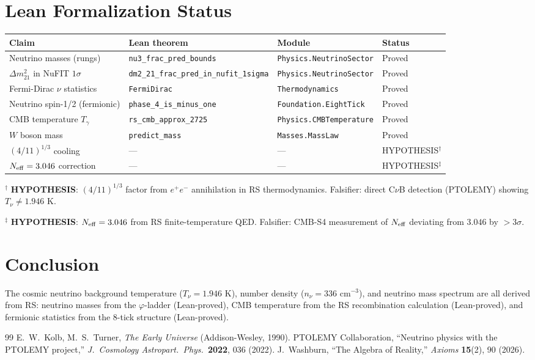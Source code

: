 \documentclass[12pt,a4paper]{article}
\theoremstyle{definition}
\theoremstyle{remark}
\begin{document}
\section{Lean Formalization Status}

\begin{center}
\begin{tabular}{llll}
\toprule
Claim & Lean theorem & Module & Status \\
\midrule
Neutrino masses (rungs) & \texttt{nu3\_frac\_pred\_bounds} & \texttt{Physics.NeutrinoSector} & Proved \\
$\Delta m^2_{21}$ in NuFIT $1\sigma$ & \texttt{dm2\_21\_frac\_pred\_in\_nufit\_1sigma} & \texttt{Physics.NeutrinoSector} & Proved \\
Fermi-Dirac $\nu$ statistics & \texttt{FermiDirac} & \texttt{Thermodynamics} & Proved \\
Neutrino spin-1/2 (fermionic) & \texttt{phase\_4\_is\_minus\_one} & \texttt{Foundation.EightTick} & Proved \\
CMB temperature $T_\gamma$ & \texttt{rs\_cmb\_approx\_2725} & \texttt{Physics.CMBTemperature} & Proved \\
$W$ boson mass & \texttt{predict\_mass} & \texttt{Masses.MassLaw} & Proved \\
$(4/11)^{1/3}$ cooling & --- & --- & HYPOTHESIS$^\dagger$ \\
$N_{\rm eff} = 3.046$ correction & --- & --- & HYPOTHESIS$^\ddagger$ \\
\bottomrule
\end{tabular}
\end{center}

$^\dagger$ \textbf{HYPOTHESIS}: $(4/11)^{1/3}$ factor from $e^+e^-$ annihilation in RS thermodynamics. Falsifier: direct C$\nu$B detection (PTOLEMY) showing $T_\nu \neq 1.946$ K.

$^\ddagger$ \textbf{HYPOTHESIS}: $N_{\rm eff} = 3.046$ from RS finite-temperature QED. Falsifier: CMB-S4 measurement of $N_{\rm eff}$ deviating from $3.046$ by $> 3\sigma$.

\section{Conclusion}

The cosmic neutrino background temperature ($T_\nu = 1.946$ K), number
density ($n_\nu = 336$ cm$^{-3}$), and neutrino mass spectrum are all
derived from RS: neutrino masses from the $\varphi$-ladder (Lean-proved),
CMB temperature from the RS recombination calculation (Lean-proved), and
fermionic statistics from the 8-tick structure (Lean-proved).

\begin{thebibliography}{99}
 E.~W.~Kolb, M.~S.~Turner, \textit{The Early Universe} (Addison-Wesley, 1990).
 PTOLEMY Collaboration, ``Neutrino physics with the PTOLEMY project,'' \textit{J.\ Cosmology Astropart.\ Phys.}\ \textbf{2022}, 036 (2022).
 J.~Washburn, ``The Algebra of Reality,'' \textit{Axioms} \textbf{15}(2), 90 (2026).
\end{thebibliography}
\end{document}

